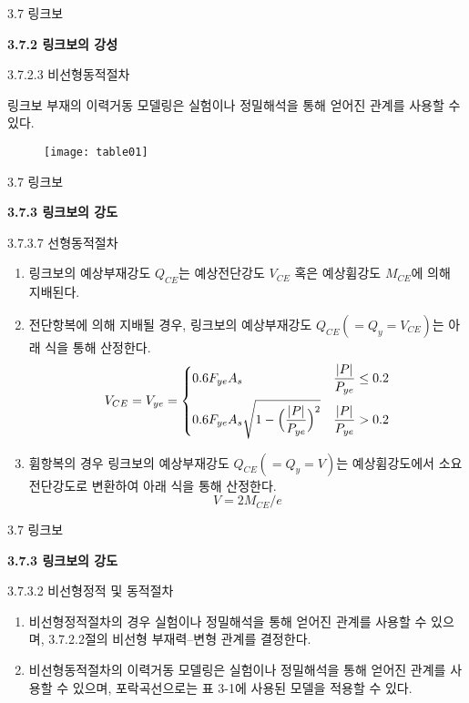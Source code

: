 	\begin{frame}{3.7 링크보}

	\textbf{3.7.2 링크보의 강성}
	
	3.7.2.3 비선형동적절차
	
	링크보 부재의 이력거동 모델링은 실험이나 정밀해석을 통해 얻어진 관계를 사용할 수 있다. 
	\end{frame}	
	
	
	\begin{frame}
		\begin{figure}
			\centering
			\texttt{[image: table01]}
		\end{figure}
	\end{frame}


	\begin{frame}{3.7 링크보}

	\textbf{3.7.3 링크보의 강도}
	
	3.7.3.7 선형동적절차
	
	\begin{enumerate}
		\item[(1)] 링크보의 예상부재강도 $Q_{CE}$는 예상전단강도 $V_{CE}$ 혹은 예상휨강도 $M_{CE}$에 의해 지배된다. 
		\item[(2)] 전단항복에 의해 지배될 경우, 링크보의 예상부재강도 $Q_{CE}(=Q_y=V_{CE})$는 아래 식을 통해 산정한다.  
			\[V_{CE} = V_{ye} = \begin{dcases}0.6F_{ye}A_s & \frac{\vert P\vert}{P_{ye}} \leq 0.2 \\0.6F_{ye}A_s\sqrt{1 - \Big(\frac{\vert P\vert}{P_{ye}}\Big)^2} & \frac{\vert P\vert}{P_{ye}} > 0.2\end{dcases}\]
		\item[(3)] 휨항복의 경우 링크보의 예상부재강도 $Q_{CE}(=Q_y=V)$는 예상휨강도에서 소요전단강도로 변환하여 아래 식을 통해 산정한다.
			\[V = 2M_{CE}/e\] 
	\end{enumerate}
	\end{frame}	


	\begin{frame}{3.7 링크보}

	\textbf{3.7.3 링크보의 강도}
	
	3.7.3.2 비선형정적 및 동적절차
	
	\begin{enumerate}
		\item[(1)] 비선형정적절차의 경우 실험이나 정밀해석을 통해 얻어진 관계를 사용할 수 있으며, 3.7.2.2절의 비선형 부재력--변형 관계를 결정한다. 
		\item[(2)] 비선형동적절차의 이력거동 모델링은 실험이나 정밀해석을 통해 얻어진 관계를 사용할 수 있으며, 포락곡선으로는 표 3-1에 사용된 모델을 적용할 수 있다. 
	\end{enumerate}
	\end{frame}	
	

